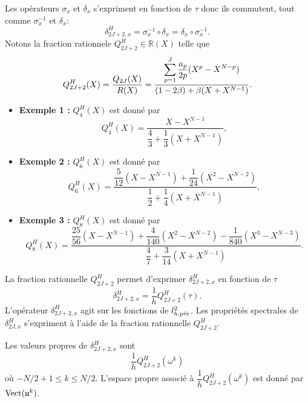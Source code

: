 Les opérateurs $\sigma_x$ et $\delta_{x}$ s’expriment en fonction de $\tau$ donc ils commutent, tout comme $\sigma_x^{-1}$ et $\delta_{x}$:
\begin{equation}
\delta_{2J+2,x}^H = \sigma_x^{-1} \circ \delta_{x} = \delta_{x} \circ \sigma_x^{-1}.
\end{equation}
Notons la fraction rationnele $Q_{2J+2}^H \in \mathbb{R}(X)$ telle que 
\begin{equation}
Q_{2J+2}^H(X) = \dfrac{Q_{2J}(X)}{R(X)} = \dfrac{\gsum_{p=1}^J \dfrac{a_p}{2p} (X^p - X^{N-p})}{(1-2\beta) + \beta ( X + X^{N-1})}.
\label{eq:pol_hermitien}
\end{equation}
\begin{itemize}
\item \textbf{Exemple 1 :} $Q_4^H(X)$ est donné par
\begin{equation}
Q_4^H(X) = \dfrac{X-X^{N-1}}{\dfrac{4}{3} + \dfrac{1}{3}(X+X^{N-1})},
\label{eq:polhermi4}
\end{equation}
\item \textbf{Exemple 2 :} $Q_6^H(X)$ est donné par
\begin{equation}
Q_6^H(X) = \dfrac{\dfrac{5}{12}(X-X^{N-1}) + \dfrac{1}{24}(X^2-X^{N-2})}{\dfrac{1}{2} + \dfrac{1}{4}(X+X^{N-1})},
\end{equation}
\item \textbf{Exemple 3 :} $Q_8^H(X)$ est donné par
\begin{equation}
Q_8^H(X) = \dfrac{\dfrac{25}{56}(X-X^{N-1}) + \dfrac{4}{140}(X^2-X^{N-2}) - \dfrac{1}{840}(X^3-X^{N-3})}{\dfrac{4}{7} + \dfrac{3}{14}(X+X^{N-1})}.
\end{equation}
\end{itemize}

La fraction rationnelle $Q_{2J+2}^H$ permet d'exprimer $\delta_{2J+2,x}^H$ en fonction de $\tau$
\begin{equation}
\delta_{2J+2,x}^H = \dfrac{1}{h} Q_{2J+2}^H(\tau).
\end{equation}
L'opérateur $\delta_{2J+2,x}^H$ agit sur les fonctions de $l^2_{h,\per}$. Les propriétés spectrales de $\delta_{2J,x}^H$ s'expriment à l'aide de la fraction rationnelle $Q_{2J+2}^H$.

\begin{proposition}
Les valeurs propres de $\delta_{2J+2,x}^H$ sont 
\begin{equation}
\dfrac{1}{h} Q_{2J+2}^H (\omega^k)
\end{equation}
où $-N/2+1 \leq k \leq N/2$. L'espace propre associé à $\dfrac{1}{h} Q_{2J+2}^H (\omega^k)$ est donné par $\Vect( \mathfrak{u}^k )$.
\label{prop:eigen_mat_hermitien}
\end{proposition}

